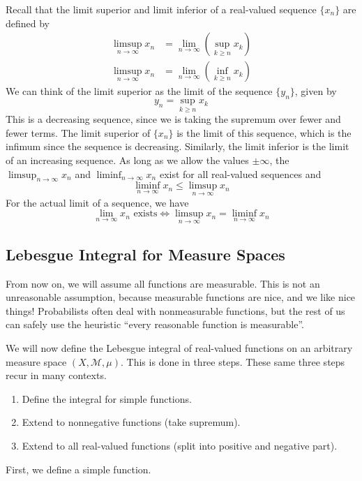 \documentclass[10pt]{article}         %
\theoremstyle{remark}
\begin{document}
Recall that the limit superior and limit inferior of a real-valued sequence $\{ x_n \}$ are defined by
\begin{align*}
\limsup_{n\rightarrow\infty} x_n &= \lim_{n \rightarrow \infty} \left( \sup_{k \geq n} x_k \right) \\
\limsup_{n\rightarrow\infty} x_n &= \lim_{n \rightarrow \infty} \left( \inf_{k \geq n} x_k \right) 
\end{align*}
We can think of the limit superior as the limit of the sequence $\{ y_n \} $, given by
\[
y_n = \sup_{k \geq n} x_k
\]
This is a decreasing sequence, since we is taking the supremum over fewer and fewer terms. The limit superior of $\{x_n \}$ is the limit of this sequence, which is the infimum since the sequence is decreasing. Similarly, the limit inferior is the limit of an increasing sequence. As long as we allow the values $\pm \infty$, the $\limsup_{n\rightarrow\infty} x_n$ and $\liminf_{n\rightarrow\infty} x_n$ exist for all real-valued sequences and
\[
\liminf_{n\rightarrow\infty} x_n 
\leq \limsup_{n\rightarrow\infty} x_n
\]
For the actual limit of a sequence, we have
\[
\lim_{n \rightarrow \infty} x_n \text{ exists} \iff
\limsup_{n\rightarrow\infty} x_n = \liminf_{n\rightarrow\infty} x_n
\]

\subsection{Lebesgue Integral for Measure Spaces}

From now on, we will assume all functions are measurable. This is not an unreasonable assumption, because measurable functions are nice, and we like nice things! Probabilists often deal with nonmeasurable functions, but the rest of us can safely use the heuristic ``every reasonable function is measurable''.

We will now define the Lebesgue integral of real-valued functions on an arbitrary measure space $(X, \mathcal{M}, \mu)$. This is done in three steps. These same three steps recur in many contexts.
\begin{enumerate}
    \item Define the integral for simple functions.
    \item Extend to nonnegative functions (take supremum).
    \item Extend to all real-valued functions (split into positive and negative part).
\end{enumerate}

First, we define a simple function.
\end{document}
